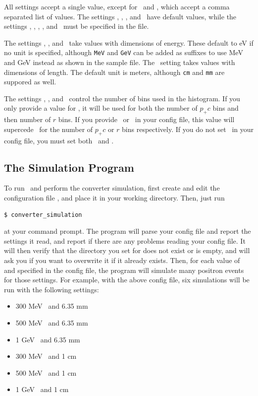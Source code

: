 \documentclass[12pt]{article}
\begin{document}
All settings accept a single value, except for \pcin \, and \targett, which accept a comma separated list of values.
The settings \outpcmin, \outdir, \numbins, and \fitxpt \, have default values, while the settings \targetm, \targett, \pcin, \outpcmax, and \dxydsmax \, must be specified in the file.

The settings \pcin, \outpcmin, and \outpcmax \, take values with dimensions of energy.
These default to eV if no unit is specified, although \texttt{MeV} and \texttt{GeV} can be added as suffixes to use MeV and GeV instead as shown in the sample file.
The \targett \, setting takes values with dimensions of length.
The default unit is meters, although \texttt{cm} and \texttt{mm} are suppored as well.

The settings \numbins, \numpcbins, and \numrbins \, control the number of bins used in the histogram.
If you only provide a value for \numbins, it will be used for both the number of $p_+c$ bins and then number of $r$ bins.
If you provide \numpcbins \, or \numrbins \, in your config file, this value will supercede \numbins \, for the number of $p_+ c$ or $r$ bins respectively.
If you do not set \numbins \, in your config file, you must set both \numpcbins \, and \numrbins.

\subsection{The Simulation Program}

To run \exes \, and perform the converter simulation, first create and edit the configuration file \configfile, and place it in your working directory.
Then, just run
\begin{verbatim}
$ converter_simulation
\end{verbatim}
at your command prompt.
The program will parse your config file and report the settings it read, and report if there are any problems reading your config file.
It will then verify that the directory you set for \outdir does not exist or is empty, and will ask you if you want to overwrite it if it already exists.
Then, for each value of \pcin \, and \targett specified in the config file, the program will simulate many positron events for those settings.
For example, with the above config file, six simulations will be run with the following settings:
\begin{itemize}
\item
300 MeV \pcin \, and 6.35 mm \targett

\item
500 MeV \pcin \, and 6.35 mm \targett

\item
1 GeV \pcin \, and 6.35 mm \targett

\item
300 MeV \pcin \, and 1 cm \targett

\item
500 MeV \pcin \, and 1 cm \targett

\item
1 GeV \pcin \, and 1 cm \targett
\end{itemize}
\end{document}
